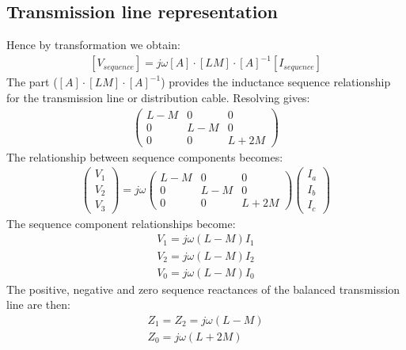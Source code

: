 \subsection{Transmission line representation}
Hence by transformation we obtain:
\begin{gather}
	\left[V_{sequence}\right] = j\omega\left[A\right]\cdot \left[LM\right]\cdot\left[A\right]^{-1}\left[I_{sequence}\right]
\end{gather}
The part ($\left[A\right]\cdot \left[LM\right]\cdot\left[A\right]^{-1}$) provides the inductance sequence relationship for the transmission line or distribution cable. Resolving gives:
\begin{gather}
	\begin{pmatrix}
		L-M & 0    & 0    \\
		0   & L- M & 0    \\
		0   & 0    & L+2M
	\end{pmatrix}
\end{gather}
The relationship between sequence components becomes:
\begin{gather}
	\begin{pmatrix}
		V_1 \\
		V_2 \\
		V_3
	\end{pmatrix} = j \omega \begin{pmatrix}
		L-M & 0    & 0    \\
		0   & L- M & 0    \\
		0   & 0    & L+2M
	\end{pmatrix} \begin{pmatrix}
		I_a \\
		I_b \\
		I_c
	\end{pmatrix}
\end{gather}
The sequence component relationships become:
\begin{gather}
	V_1 = j\omega \left(L - M\right)I_1\\
	V_2 = j\omega \left(L - M\right)I_2\\
	V_0 = j\omega \left(L - M\right)I_0
\end{gather}
The positive, negative and zero sequence reactances of the balanced transmission line are then:
\begin{gather}
	Z_1 = Z_2 = j\omega \left(L-M\right) \\
	Z_0 = j\omega \left(L+2M\right)
\end{gather}
